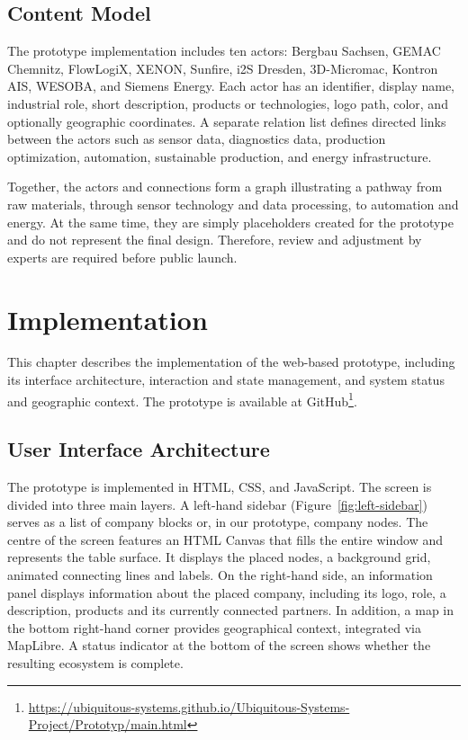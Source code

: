 \documentclass[sigconf,nonacm]{acmart}
\begin{document}
\subsection{Content Model}

The prototype implementation includes ten actors: Bergbau Sachsen, GEMAC Chemnitz, FlowLogiX, XENON, Sunfire, i2S Dresden, 3D-Micromac, Kontron AIS, WESOBA, and Siemens Energy. Each actor has an identifier, display name, industrial role, short description, products or technologies, logo path, color, and optionally geographic coordinates. A separate relation list defines directed links between the actors such as sensor data, diagnostics data, production optimization, automation, sustainable production, and energy infrastructure.

Together, the actors and connections form a graph illustrating a pathway from raw materials, through sensor technology and data processing, to automation and energy. At the same time, they are simply placeholders created for the prototype and do not represent the final design. Therefore, review and adjustment by experts are required before public launch.

\section{Implementation}

This chapter describes the implementation of the web-based prototype, including its interface architecture, interaction and state management, and system status and geographic context. The prototype is available at GitHub\footnote{\url{https://ubiquitous-systems.github.io/Ubiquitous-Systems-Project/Prototyp/main.html}}.

\subsection{User Interface Architecture}

The prototype is implemented in HTML, CSS, and JavaScript. The screen is divided into three main layers. A left-hand sidebar (Figure~\ref{fig:left-sidebar}) serves as a list of company blocks or, in our prototype, company nodes. The centre of the screen features an HTML Canvas that fills the entire window and represents the table surface. It displays the placed nodes, a background grid, animated connecting lines and labels. On the right-hand side, an information panel displays information about the placed company, including its logo, role, a description, products and its currently connected partners. In addition, a map in the bottom right-hand corner provides geographical context, integrated via MapLibre. A status indicator at the bottom of the screen shows whether the resulting ecosystem is complete.
\end{document}

